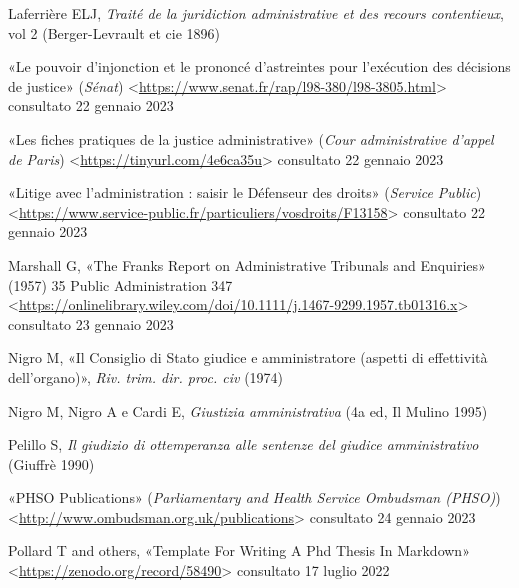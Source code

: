 \documentclass[12pt,it,a4paper,]{report}
\newlength{\cslhangindent}
\newenvironment{CSLReferences}[2] %
 {%
  \setlength{\parindent}{0pt}
  \ifodd #1 \everypar{\setlength{\hangindent}{\cslhangindent}}\ignorespaces\fi
  \ifnum #2 > 0
  \setlength{\parskip}{#2\baselineskip}
  \fi
 }%
 {}
\begin{document}
\begin{CSLReferences}{0}{0}
\leavevmode{}%
Laferrière ELJ, \emph{Traité de la juridiction administrative et des
recours contentieux}, vol 2 (Berger-Levrault et cie 1896)

\leavevmode{}%
{«Le pouvoir d'injonction et le prononcé d'astreintes pour l'exécution
des décisions de justice»} (\emph{Sénat})
\textless{}\url{https://www.senat.fr/rap/l98-380/l98-3805.html}\textgreater{}
consultato 22 gennaio 2023

\leavevmode{}%
{«Les fiches pratiques de la justice administrative»} (\emph{Cour
administrative d'appel de Paris})
\textless{}\url{https://tinyurl.com/4e6ca35u}\textgreater{} consultato
22 gennaio 2023

\leavevmode{}%
{«Litige avec l'administration : saisir le Défenseur des droits»}
(\emph{Service Public})
\textless{}\url{https://www.service-public.fr/particuliers/vosdroits/F13158}\textgreater{}
consultato 22 gennaio 2023

\leavevmode{}%
Marshall G, {«The Franks Report on Administrative Tribunals and
Enquiries»} (1957) 35 Public Administration 347
\textless{}\url{https://onlinelibrary.wiley.com/doi/10.1111/j.1467-9299.1957.tb01316.x}\textgreater{}
consultato 23 gennaio 2023

\leavevmode{}%
Nigro M, {«Il Consiglio di Stato giudice e amministratore (aspetti di
effettività dell'organo)»}, \emph{Riv. trim. dir. proc. civ} (1974)

\leavevmode{}%
Nigro M, Nigro A e Cardi E, \emph{Giustizia amministrativa} (4a ed, Il
Mulino 1995)

\leavevmode{}%
Pelillo S, \emph{Il giudizio di ottemperanza alle sentenze del giudice
amministrativo} (Giuffrè 1990)

\leavevmode{}%
{«PHSO Publications»} (\emph{Parliamentary and Health Service Ombudsman
(PHSO)})
\textless{}\url{http://www.ombudsman.org.uk/publications}\textgreater{}
consultato 24 gennaio 2023

\leavevmode{}%
Pollard T and others, {«Template For Writing A Phd Thesis In Markdown»}
\textless{}\url{https://zenodo.org/record/58490}\textgreater{}
consultato 17 luglio 2022


\end{CSLReferences}
\end{document}
